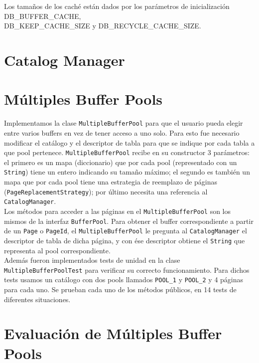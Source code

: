 \documentclass[a4paper,10pt]{article}
\begin{document}
Los tamaños de los caché están dados por los parámetros de inicialización DB\_BUFFER\_CACHE,\\DB\_KEEP\_CACHE\_SIZE y DB\_RECYCLE\_CACHE\_SIZE.\\


\newpage

\section{Catalog Manager}

\section{Múltiples Buffer Pools}
Implementamos la clase \texttt{MultipleBufferPool} para que el usuario pueda elegir entre varios buffers en vez de tener acceso a uno solo. Para esto fue necesario modificar el catálogo y el descriptor de tabla para que se indique por cada tabla a que pool pertenece. \texttt{MultipleBufferPool} recibe en su constructor 3 parámetros: el primero es un mapa (diccionario) que por cada pool (representado con un \texttt{String}) tiene un entero indicando su tamaño máximo; el segundo es también un mapa que por cada pool tiene una estrategia de reemplazo de páginas (\texttt{PageReplacementStrategy}); por último necesita una referencia al \texttt{CatalogManager}.\\

Los métodos para acceder a las páginas en el \texttt{MultipleBufferPool} son los mismos de la interfaz \texttt{BufferPool}. Para obtener el buffer correspondiente a partir de un \texttt{Page} o \texttt{PageId}, el \texttt{MultipleBufferPool} le pregunta al \texttt{CatalogManager} el descriptor de tabla de dicha página, y con ése descriptor obtiene el \texttt{String} que representa al pool correspondiente.\\

Además fueron implementados tests de unidad en la clase \texttt{MultipleBufferPoolTest} para verificar su correcto funcionamiento. Para dichos tests usamos un catálogo con dos pools llamados \texttt{POOL\_1} y \texttt{POOL\_2} y 4 páginas para cada uno. Se prueban cada uno de los métodos públicos, en 14 tests de diferentes situaciones.

\newpage

\section{Evaluación de Múltiples Buffer Pools}
\end{document}
